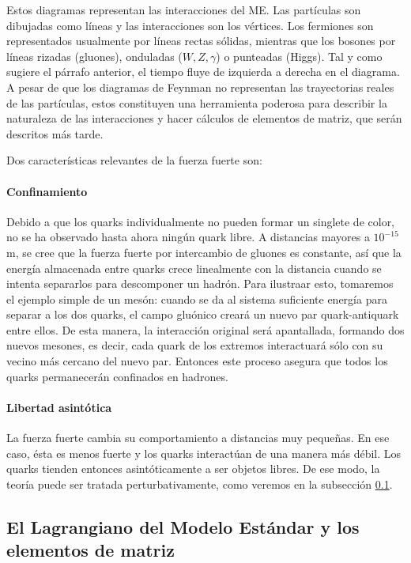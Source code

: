 \documentclass[a4paper,12pt]{article}
\begin{document}
Estos diagramas representan las interacciones del ME. Las partículas son dibujadas como líneas y las interacciones son los vértices. Los fermiones son representados usualmente por líneas rectas sólidas, mientras que los bosones por líneas rizadas (gluones), onduladas ($W, Z, \gamma$) o punteadas (Higgs). Tal y como sugiere el párrafo anterior, el tiempo fluye de izquierda a derecha en el diagrama. A pesar de que los diagramas de Feynman no representan las trayectorias reales de las partículas, estos constituyen una herramienta poderosa para describir la naturaleza de las interacciones y hacer cálculos de elementos de matriz, que serán descritos más tarde.

Dos características relevantes de la fuerza fuerte son:

\paragraph{Confinamiento} Debido a que los quarks individualmente no pueden formar un singlete de color, no se ha observado hasta ahora ningún quark libre. A distancias mayores a $10^{-15}$ m, se cree que la fuerza fuerte por intercambio de gluones es constante, así que la energía almacenada entre quarks crece linealmente con la distancia cuando se intenta separarlos para descomponer un hadrón. Para ilustraar esto, tomaremos el ejemplo simple de un mesón: cuando se da al sistema suficiente energía para separar a los dos quarks, el campo gluónico creará un nuevo par quark-antiquark entre ellos. De esta manera, la interacción original será apantallada, formando dos nuevos mesones, es decir, cada quark de los extremos interactuará sólo con su vecino más cercano del nuevo par. Entonces este proceso asegura que todos los quarks permanecerán confinados en hadrones.

\paragraph{Libertad asintótica} La fuerza fuerte cambia su comportamiento a distancias muy pequeñas. En ese caso, ésta es menos fuerte y los quarks interactúan de una manera más débil. Los quarks tienden entonces asintóticamente a ser objetos libres. De ese modo, la teoría puede ser tratada perturbativamente, como veremos en la subsección \ref{subsec:QCDLag}.

\subsection{El Lagrangiano del Modelo Estándar y los elementos de matriz}
\label{subsec:QCDLag}
\end{document}
